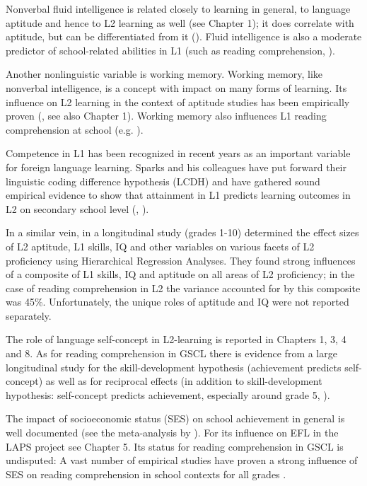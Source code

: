 \documentclass[output=paper]{langsci/langscibook}
\begin{document}
Nonverbal fluid intelligence is related closely to learning in general, to language aptitude and hence to L2 learning as well (see Chapter 1); it does correlate with aptitude, but can be differentiated from it (\citealt{SparksEtAl2012}). Fluid intelligence is also a moderate predictor of school-related abilities in L1 (such as reading comprehension, \citealt{PengEtAl2019}).

Another nonlinguistic variable is working memory. Working memory, like nonverbal intelligence, is a concept with impact on many forms of learning. Its influence on L2 learning in the context of aptitude studies has been empirically proven (\citealt{WenEtAl2017}, see also Chapter 1). Working memory also influences L1 reading comprehension at school (e.g. \citealt{PengEtAl2017}).

Competence in L1 has been recognized in recent years as an important variable for foreign language learning. Sparks and his colleagues have put forward their linguistic coding difference hypothesis (LCDH) and have gathered sound empirical evidence to show that attainment in L1 predicts learning outcomes in L2 on secondary school level (\citealt{SparksEtAl2012}, \citealt{Li2016}).

In a similar vein, in a longitudinal study (grades 1-10) \citet{SparksEtAl2012} determined the effect sizes of L2 aptitude, L1 skills, IQ and other variables on various facets of L2 proficiency using Hierarchical Regression Analyses. They found strong influences of a composite of L1 skills, IQ and aptitude on all areas of L2 proficiency; in the case of reading comprehension in L2 the variance accounted for by this composite was 45\%. Unfortunately, the unique roles of aptitude and IQ were not reported separately. 

The role of language self-concept in L2-learning is reported in Chapters 1, 3, 4 and 8. As for reading comprehension in GSCL there is evidence from a large longitudinal study for the skill-development hypothesis (achievement predicts self-concept) as well as for reciprocal effects (in addition to skill-development hypothesis: self-concept predicts achievement, especially around grade 5, \citealt{RetelsdorfEtAl2014}).

The impact of socioeconomic status (SES) on school achievement in general is well documented (see the meta-analysis by \citealt{Sirin2005}). For its influence on EFL in the LAPS project see Chapter 5. Its status for reading comprehension in GSCL is undisputed: A vast number of empirical studies have proven a strong influence of SES on reading comprehension in school contexts for all grades \citep{Schaffner2009}.
\end{document}
